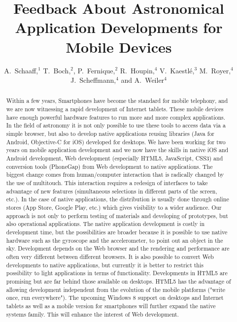 
\resetcounters



\title{Feedback About Astronomical Application Developments for Mobile Devices}
\author{A.~Schaaff,$^1$ T.~Boch,$^2$, P.~Fernique,$^2$ R.~Houpin,$^4$ V.~Kaestl\'e,$^3$ M.~Royer,$^4$ J.~Scheffmann,$^4$ and A.~Weiler$^4$
}


\begin{abstract}
Within a few years, Smartphones have become the standard for mobile telephony, and we are now witnessing a rapid development of Internet tablets. These mobile devices have enough powerful hardware features to run more and more complex applications. In the field of astronomy it is not only possible to use these tools to access data via a simple browser, but also to develop native applications reusing libraries (Java for Android, Objective-C for iOS) developed for desktops. We have been working for two years on mobile application development and we now have the skills in native iOS and Android development, Web development (especially HTML5, JavaScript, CSS3) and conversion tools (PhoneGap) from Web development to native applications. The biggest change comes from human/computer interaction that is radically changed by the use of multitouch. This interaction requires a redesign of interfaces to take advantage of new features (simultaneous selections in different parts of the screen, etc.). In the case of native applications, the distribution is usually done through online stores (App Store, Google Play, etc.) which gives visibility to a wider audience. Our approach is not only to perform testing of materials and developing of prototypes, but also operational applications. The native application development is costly in development time, but the possibilities are broader because it is possible to use native hardware such as the gyroscope and the accelerometer, to point out an object in the sky. Development depends on the Web browser and the rendering and performance are often very different between different browsers. It is also possible to convert Web developments to native applications, but currently it is better to restrict this possibility to light applications in terms of functionality. Developments in HTML5 are promising but are far behind those available on desktops. HTML5 has the advantage of allowing development independent from the evolution of the mobile platforms ("write once, run everywhere"). The upcoming Windows 8 support on desktops and Internet tablets as well as a mobile version for smartphones will further expand the native systems family. This will enhance the interest of Web development.
\end{abstract}

